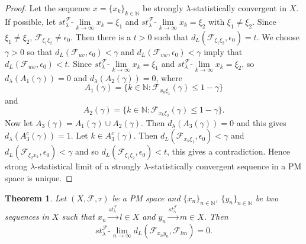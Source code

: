 \documentclass[reqno,b5paper]{amsart}
\theoremstyle{plain}
\newtheorem{thm}{Theorem}[section]
\theoremstyle{definition}
\begin{document}
\begin{proof}
Let the sequence $x=\{x_k\}_{k \in\mathbb{N}}$ be strongly
$\lambda$-statistically convergent in $X$. If possible, let $
st_\lambda^{\mathcal{F}}$-$\lim\limits_{k\rightarrow\infty}x_k =
\xi_1 $ and $st_\lambda^{\mathcal{F}}$-$\lim\limits_{k\rightarrow
\infty}x_k = \xi_2$ with $\xi_1\neq \xi_2$. Since $\xi_1 \neq
\xi_2$, $\mathcal{F}_{\xi_1\xi_2}\neq\epsilon_0$. Then there is a
$t>0$ such that $d_L(\mathcal{F}_{\xi_1\xi_2},\epsilon_0)=t$. We
choose $\gamma>0$ so that
$d_L(\mathcal{F}_{uv},\epsilon_0)<\gamma$ and
$d_L(\mathcal{F}_{vw},\epsilon_0)<\gamma $ imply that
$d_L(\mathcal{F}_{uw},\epsilon_0)<t$. Since
$st_\lambda^{\mathcal{F}}$-$\lim\limits_{k\rightarrow \infty}x_k =
\xi_1 $ and
$st_\lambda^{\mathcal{F}}$-$\lim\limits_{k\rightarrow\infty}x_k =
\xi_2$, so $d_{\lambda}(A_1(\gamma)) = 0$ and
$d_{\lambda}(A_2(\gamma)) = 0$, where
$$A_1(\gamma)=\{k\in\mathbb{N}: \mathcal{F}_{x_k\xi_1}(\gamma)\leq 1- \gamma\}$$ and
$$A_2(\gamma)=\{k\in \mathbb{N}: \mathcal{F}_{x_k\xi_2}(\gamma)\leq 1- \gamma\}.$$
Now let $A_3(\gamma)=A_1(\gamma)\cup A_2(\gamma)$. Then
$d_\lambda(A_3(\gamma))=0$ and this gives
$d_\lambda(A^c_3(\gamma))=1$. Let $k\in A^c_3(\gamma)$. Then
$d_L(\mathcal{F}_{x_k\xi_1},\epsilon_0)<\gamma$ and
$d_L(\mathcal{F}_{\xi_2x_k},\epsilon_0)<\gamma$ and so
$d_L(\mathcal{F}_{\xi_1\xi_2},\epsilon_0)<t$, this gives a
contradiction. Hence strong $\lambda$-statistical limit of a
strongly $\lambda$-statistically convergent sequence in a PM space
is unique.
\end{proof}
\begin{thm}
Let $(X,\mathcal{F},\tau)$ be a PM space and
$\{x_n\}_{n\in\mathbb{N}}$, $\{y_n\}_{n\in\mathbb{N}}$ be two
sequences in $X$ such that
$x_n\xrightarrow{st^\mathcal{F}_{\lambda}} l \in X $ and
$y_n\xrightarrow{st^\mathcal{F}_{\lambda}} m \in X$. Then
$$st^\mathcal{F}_\lambda\mbox{-}\lim\limits_{n\rightarrow\infty}d_L(\mathcal{F}_{x_ny_n}, \mathcal{F}_{lm})=0.$$
\end{thm}
\end{document}

